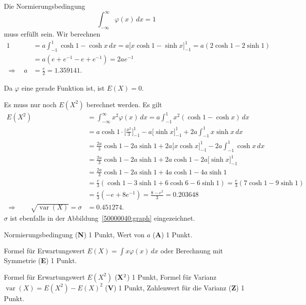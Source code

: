 \begin{loesung}
\begin{teilaufgaben}
\item
Die Normierungsbedingung
\[
\int_{-\infty}^\infty \varphi(x)\,dx =1
\]
muss erfüllt sein.
Wir berechnen
\begin{align*}
1
&=
a\int_{-1}^1 \cosh 1 - \cosh x\,dx
=
a\biggl[ x \cosh 1 - \sinh x\biggr]_{-1}^1
=
a(2\cosh1 -2\sinh 1)
\\
&=
a(e + e^{-1} - e + e^{-1})
=
2ae^{-1}
\\
\Rightarrow\quad
a&=\frac{e}{2}=1.359141.
\end{align*}
\item
Da $\varphi$ eine gerade Funktion ist, ist $E(X)=0$.
\item
Es muss nur noch $E(X^2)$ berechnet werden.
Es gilt
\begin{align*}
E(X^2)
&=
\int_{-\infty}^\infty x^2\varphi(x)\,dx
=
a\int_{-1}^1 x^2 (\cosh 1 - \cosh x)\,dx
\\
&=
a\cosh 1\cdot \biggl[\frac{x^2}{3}\biggr]_{-1}^1
-
a\biggl[\sinh x\biggr]_{-1}^{1}
+
2a\int_{-1}^1 x\sinh x\,dx
\\
&=
\frac{2a}{3}\cosh 1 - 2a\sinh 1
+2a\biggl[x\cosh x\biggr]_{-1}^1
-2a\int_{-1}^1 \cosh x\,dx
\\
&=
\frac{2a}{3}\cosh 1
 - 2a\sinh 1
+2a\cosh 1
-2a\biggl[\sinh x\biggr]_{-1}^1
\\
&=
\frac{2a}{3}\cosh 1
 - 2a\sinh 1
+4a\cosh 1
-4a\sinh 1
\\
&=
\frac{e}{3}
(\cosh 1 -3\sinh 1 + 6\cosh 6 - 6\sinh 1)
=
\frac{e}{3}(7\cosh 1 - 9 \sinh 1)
\\
&=
\frac{e}{3}(-e+8e^{-1})
=
\frac{8-e^2}{3}
=
0.203648
\\
\Rightarrow\qquad
\sqrt{\operatorname{var}(X)}
=
\sigma
&=
0.451274.
\end{align*}
$\sigma$ ist ebenfalls in der Abbildung~\ref{50000040:graph} eingezeichnet.
\qedhere
\end{teilaufgaben}
\end{loesung}

\begin{bewertung}
\begin{teilaufgaben}
\item
Normierungsbedingung ({\bf N}) 1 Punkt,
Wert von $a$ ({\bf A}) 1 Punkt.
\item
Formel für Erwartungswert $E(X)=\int x\varphi(x)\,dx$
oder Berechnung mit Symmetrie ({\bf E}) 1 Punkt.
\item
Formel für Erwartungswert $E(X^2)$  ({\bf X$\mathstrut^2$}) 1 Punkt,
Formel für Varianz $\operatorname{var}(X) = E(X^2)-E(X)^2$ ({\bf V}) 1 Punkt,
Zahlenwert für die Varianz ({\bf Z}) 1 Punkt.
\end{teilaufgaben}
\end{bewertung}

